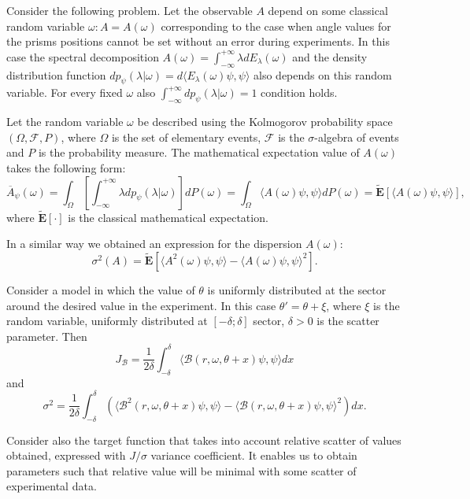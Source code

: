 \documentclass[%
master,         %
subf,           %
href,           %
colorlinks=true %
]{disser}
\numberwithin{equation}{section}
\numberwithin{figure}{section}
\begin{document}
Consider the following problem. Let the observable $A$ depend on some classical random variable 
$\omega: A = A(\omega)$ corresponding to the case when angle values for the prisms positions 
cannot be set without an error during experiments. In this case the spectral decomposition 
$A(\omega) = \int_{-\infty}^{+\infty}\lambda dE_\lambda(\omega)$ and the density distribution function 
$dp_\psi (\lambda|\omega) = d\langle E_\lambda(\omega)\psi, \psi\rangle$ also depends on 
this random variable. For every fixed $\omega$ also 
$\int_{-\infty}^{+\infty}dp_\psi (\lambda|\omega) = 1$ condition holds.

Let the random variable $\omega$ be described using the Kolmogorov probability space $(\Omega, \mathcal{F}, P)$, where $\Omega$ is the set of elementary events, $\mathcal{F}$ is the $\sigma$-algebra of events and $P$ is the probability measure. The mathematical expectation value of $A(\omega)$ takes the following form:
\[
\overline{A}_\psi(\omega) = \int_\Omega\left[\int_{-\infty}^{+\infty}\lambda dp_\psi (\lambda|\omega)\right] dP(\omega) = \int_\Omega\langle A(\omega)\psi, \psi\rangle dP(\omega) = \mathbf{\tilde{E}}[ \langle A(\omega)\psi, \psi\rangle],
\]
where $\mathbf{\tilde{E}}[\cdot]$ is the classical mathematical expectation.

In a similar way we obtained an expression for the dispersion $A(\omega)$:
\[
\sigma^2(A) = \mathbf{\tilde{E}}[ \langle A^2(\omega)\psi, \psi\rangle - \langle A(\omega)\psi, \psi\rangle^2].
\]

Consider a model in which the value of $\theta$ is uniformly distributed at the sector around 
the desired value in the experiment. In this case $\theta' = \theta + \xi$, where $\xi$ is the random variable, uniformly distributed at $[-\delta; \delta]$ sector, $\delta > 0$ is the scatter parameter. Then
\[
J_\mathcal{B} = \frac{1}{2\delta}\int_{-\delta}^\delta \langle \mathcal{B}(r, \omega, \theta + x)\psi, \psi \rangle dx
\] and
\[
\sigma^2 = \frac{1}{2\delta}\int_{-\delta}^\delta (\langle \mathcal{B}^2(r, \omega, \theta + x)\psi, \psi \rangle - \langle \mathcal{B}(r, \omega, \theta + x)\psi, \psi \rangle^2) dx.
\]

Consider also the target function that takes into account relative scatter of values obtained, expressed with 
$J / \sigma$ variance coefficient. It enables us to obtain parameters such that relative value will be minimal 
with some scatter of experimental data.
\end{document}
